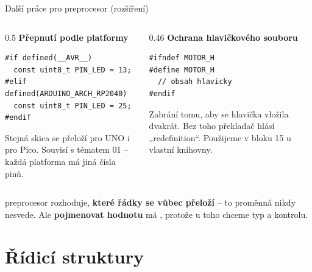 \documentclass[12pt,aspectratio=169]{beamer}
\newcommand{\roz}{ {\normalfont\footnotesize\textcolor{SPSGrey}{(rozšíření)}}}
\begin{document}
\begin{frame}[fragile]{Další práce pro preprocesor\roz}
  \begin{columns}[T]
    \begin{column}{0.5\textwidth}
      \footnotesize \textbf{Přepnutí podle platformy}
\begin{lstlisting}[style=arduino_bez_cisel]
#if defined(__AVR__)
  const uint8_t PIN_LED = 13;
#elif defined(ARDUINO_ARCH_RP2040)
  const uint8_t PIN_LED = 25;
#endif
\end{lstlisting}
      \scriptsize
      Stejná skica se přeloží pro UNO i pro Pico. Souvisí s tématem 01 --
      každá platforma má jiná čísla pinů.
    \end{column}
    \begin{column}{0.46\textwidth}
      \footnotesize \textbf{Ochrana hlavičkového souboru}
\begin{lstlisting}[style=arduino_bez_cisel]
#ifndef MOTOR_H
#define MOTOR_H
  // obsah hlavicky
#endif
\end{lstlisting}
      \scriptsize
      Zabrání tomu, aby se hlavička vložila dvakrát. Bez toho překladač hlásí
      „redefinition``. Použijeme v bloku 15 u vlastní knihovny.
    \end{column}
  \end{columns}
  \vspace{2mm}
  \small
   preprocesor rozhoduje, \textbf{které řádky se vůbec
  přeloží} -- to proměnná nikdy nesvede. Ale \textbf{pojmenovat hodnotu} má
  , protože u toho chceme typ a kontrolu.
\end{frame}

\section{Řídicí struktury}
\end{document}
